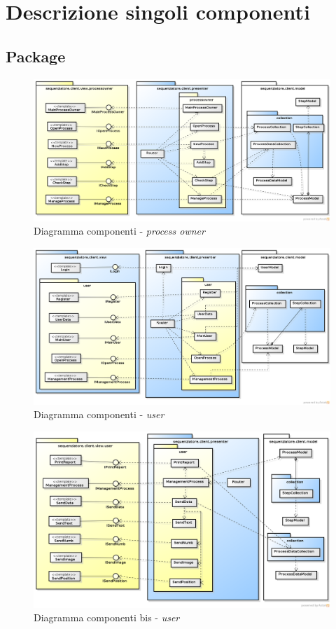 \section{Descrizione singoli componenti}

\subsection{Package \client{}}

\begin{figure}[H] \centering \includegraphics[width=%
\textwidth]
{./pack/POPackage.png} \caption{Diagramma componenti - \textit{process owner}}
\end{figure}

\begin{figure}[H] \centering \includegraphics[width=%
\textwidth]
{./pack/UserMainPackage.png} \caption{Diagramma componenti - \textit{user}}
\end{figure}

\begin{figure}[H] \centering \includegraphics[width=%
\textwidth]
{./pack/ManageProcess.png} \caption{Diagramma componenti bis - \textit{user}}
\end{figure}


